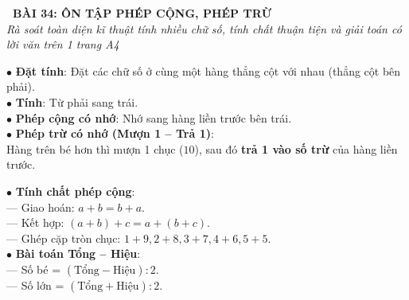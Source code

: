\documentclass[14pt,a4paper,oneside]{extbook}
\begin{document}
\noindent
\begin{tcolorbox}[
  enhanced,
  colback=teal!8!white,
  colframe=teal!80!black,
  arc=3mm, boxrule=1pt,
  left=3mm, right=3mm, top=2mm, bottom=2mm,
  halign=center
]
  {\Large\bfseries\color{teal!90!black}\faBookmark\ BÀI 34: ÔN TẬP PHÉP CỘNG, PHÉP TRỪ}\\[1.5pt]
  {\footnotesize\itshape\color{black!75} Rà soát toàn diện kĩ thuật tính nhiều chữ số, tính chất thuận tiện và giải toán có lời văn trên 1 trang A4}
\end{tcolorbox}

\vspace{2mm}

\noindent
\begin{minipage}[t]{0.49\textwidth}
  \begin{tcolorbox}[
    enhanced,
    title={\footnotesize\bfseries\color{white}\faCalculator\ 1. Quy tắc cộng trừ nhiều chữ số},
    colback=blue!2!white,
    colframe=blue!75!black,
    arc=2.5mm, boxrule=0.8pt, top=1.8mm, bottom=1.8mm, left=2mm, right=2mm
  ]
    \footnotesize
    $\bullet$ \textbf{Đặt tính}: Đặt các chữ số ở cùng một hàng thẳng cột với nhau (thẳng cột bên phải).\\
    $\bullet$ \textbf{Tính}: Từ phải sang trái.\\
    $\bullet$ \textbf{Phép cộng có nhớ}: Nhớ sang hàng liền trước bên trái.\\
    $\bullet$ \textbf{Phép trừ có nhớ (Mượn 1 -- Trả 1)}:\\
    Hàng trên bé hơn thì mượn 1 chục ($10$), sau đó \textbf{trả 1 vào số trừ} của hàng liền trước.
  \end{tcolorbox}
\end{minipage}%
\hfill
\begin{minipage}[t]{0.49\textwidth}
  \begin{tcolorbox}[
    enhanced,
    title={\footnotesize\bfseries\color{white}\faFlash\ 2. Kĩ năng tính thuận tiện \& Tổng - Hiệu},
    colback=teal!2!white,
    colframe=teal!75!black,
    arc=2.5mm, boxrule=0.8pt, top=1.8mm, bottom=1.8mm, left=2mm, right=2mm
  ]
    \footnotesize
    $\bullet$ \textbf{Tính chất phép cộng}:\\
    --- Giao hoán: $a + b = b + a$.\\
    --- Kết hợp: $(a + b) + c = a + (b + c)$.\\
    --- Ghép cặp tròn chục: $1+9, 2+8, 3+7, 4+6, 5+5$.\\
    $\bullet$ \textbf{Bài toán Tổng -- Hiệu}:\\
    --- Số bé = $(\text{Tổng} - \text{Hiệu}) : 2$.\\
    --- Số lớn = $(\text{Tổng} + \text{Hiệu}) : 2$.
  \end{tcolorbox}
\end{minipage}
\end{document}
